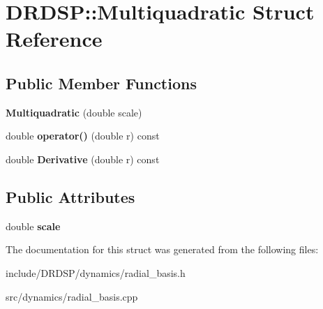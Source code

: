 \hypertarget{struct_d_r_d_s_p_1_1_multiquadratic}{\section{D\-R\-D\-S\-P\-:\-:Multiquadratic Struct Reference}
\label{struct_d_r_d_s_p_1_1_multiquadratic}
}
\subsection*{Public Member Functions}
\begin{DoxyCompactItemize}
\item 
\hypertarget{struct_d_r_d_s_p_1_1_multiquadratic_a9676531016bae341f6c2e9163041b899}{{\bfseries Multiquadratic} (double scale)}\label{struct_d_r_d_s_p_1_1_multiquadratic_a9676531016bae341f6c2e9163041b899}

\item 
\hypertarget{struct_d_r_d_s_p_1_1_multiquadratic_af06319ae007aa40fbd2833759161437f}{double {\bfseries operator()} (double r) const }\label{struct_d_r_d_s_p_1_1_multiquadratic_af06319ae007aa40fbd2833759161437f}

\item 
\hypertarget{struct_d_r_d_s_p_1_1_multiquadratic_afba9d7a5aeb541953b9a54919b013f5f}{double {\bfseries Derivative} (double r) const }\label{struct_d_r_d_s_p_1_1_multiquadratic_afba9d7a5aeb541953b9a54919b013f5f}

\end{DoxyCompactItemize}
\subsection*{Public Attributes}
\begin{DoxyCompactItemize}
\item 
\hypertarget{struct_d_r_d_s_p_1_1_multiquadratic_ad075ed2b3b85cab9d74369163eab65cf}{double {\bfseries scale}}\label{struct_d_r_d_s_p_1_1_multiquadratic_ad075ed2b3b85cab9d74369163eab65cf}

\end{DoxyCompactItemize}


The documentation for this struct was generated from the following files\-:\begin{DoxyCompactItemize}
\item 
include/\-D\-R\-D\-S\-P/dynamics/radial\-\_\-basis.\-h\item 
src/dynamics/radial\-\_\-basis.\-cpp\end{DoxyCompactItemize}
